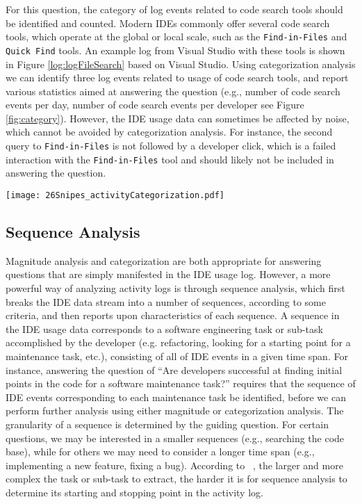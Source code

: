 For this question, the category of log events related to code search tools should be identified and counted. Modern IDEs commonly offer several code search tools, which operate at the global or local scale, such as the {\tt Find-in-Files} and {\tt Quick Find} tools.  An example log from Visual Studio with these tools is shown in Figure \ref{log:logFileSearch} based on Visual Studio. Using categorization analysis we can identify three
log events related to usage of code search tools, and report various statistics aimed at answering the question (e.g., number of code search events per day, number of code search events per developer see Figure \ref{fig:category}). However, the IDE usage data can sometimes be affected by noise, which cannot be avoided by categorization analysis. For instance, the second query to {\tt Find-in-Files} is not followed by a developer click, which is a failed interaction with the {\tt Find-in-Files} tool and should likely not be included in answering the question.


\begin{figure*}[t]
\centering

\texttt{[image: 26Snipes\_activityCategorization.pdf]}
\caption{Categorized Log Events with Search Category}
\label{fig:category}
\end{figure*}


\subsection{Sequence Analysis}

Magnitude analysis and categorization are both appropriate for answering questions that are simply manifested in the IDE usage log. However, a more powerful way of analyzing activity logs is through sequence analysis, which first breaks the IDE data stream into a number of sequences, according to some criteria, and then reports upon characteristics of each sequence. A sequence in the IDE usage data corresponds to a software engineering task or sub-task accomplished by the developer (e.g. refactoring, looking for a starting point for a maintenance task, etc.), consisting of all of IDE events in a given time span. For instance, answering the question of ``Are developers successful at finding initial points in the code for a software maintenance task?'' requires that the sequence of IDE events corresponding to each maintenance task be identified, before we can perform further analysis using either magnitude or categorization analysis. The granularity of a sequence is determined by the guiding question. For certain questions, we may be interested in a smaller sequences (e.g., searching the code base), while for others we may need to consider a longer time span (e.g., implementing a new feature, fixing a bug). 
According to ~, the larger and more complex the task or sub-task to extract, the harder it is for sequence analysis to determine its starting and stopping point in the activity log.

